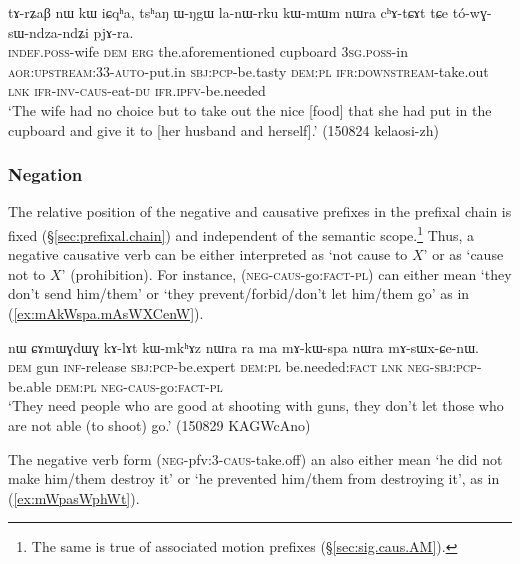 \begin{exe}
\ex \label{ex:toWGsWndzandZi.pjAra}
\gll tɤ-rʑaβ nɯ kɯ iɕqʰa, tsʰaŋ ɯ-ŋgɯ la-nɯ-rku kɯ-mɯm nɯra cʰɤ-tɕɤt tɕe tó-wɣ-sɯ-ndza-ndʑi pjɤ-ra. \\
\textsc{indef}.\textsc{poss}-wife \textsc{dem} \textsc{erg} the.aforementioned cupboard \textsc{3sg}.\textsc{poss}-in \textsc{aor}:\textsc{upstream}:3\fl{}3-\textsc{auto}-put.in \textsc{sbj}:\textsc{pcp}-be.tasty \textsc{dem}:\textsc{pl} \textsc{ifr}:\textsc{downstream}-take.out \textsc{lnk} \textsc{ifr}-\textsc{inv}-\textsc{caus}-eat-\textsc{du} \textsc{ifr}.\textsc{ipfv}-be.needed \\
\glt `The wife had no choice but to take out the nice [food] that she had put in the cupboard and give it to [her husband and herself].' (150824 kelaosi-zh)
\end{exe}


\subsubsection{Negation} \label{sec:sig.caus.negation}
The relative position of the negative and causative prefixes in the prefixal chain is fixed (§\ref{sec:prefixal.chain}) and independent of the semantic scope.\footnote{The same is true of associated motion prefixes (§\ref{sec:sig.caus.AM}). } Thus, a negative causative verb can be either  interpreted as `not cause to $X$' or as `cause not to $X$' (prohibition).   For instance,  (\textsc{neg}-\textsc{caus}-go:\textsc{fact}-\textsc{pl}) can either mean `they don't send him/them' or `they prevent/forbid/don't let him/them go' as in (\ref{ex:mAkWspa.mAsWXCenW}).
 
\begin{exe}
\ex \label{ex:mAkWspa.mAsWXCenW}
\gll nɯ ɕɤmɯɣdɯɣ kɤ-lɤt kɯ-mkʰɤz nɯra ra ma mɤ-kɯ-spa nɯra mɤ-sɯx-ɕe-nɯ. \\
\textsc{dem} gun \textsc{inf}-release \textsc{sbj}:\textsc{pcp}-be.expert \textsc{dem}:\textsc{pl} be.needed:\textsc{fact} \textsc{lnk} \textsc{neg}-\textsc{sbj}:\textsc{pcp}-be.able \textsc{dem}:\textsc{pl} \textsc{neg}-\textsc{caus}-go:\textsc{fact}-\textsc{pl} \\
\glt `They need people who are good at shooting with guns, they don't let those who are not able (to shoot) go.' (150829 KAGWcAno)
\end{exe}
 
The negative verb form  (\textsc{neg}-pfv:3\flobv{}-\textsc{caus}-take.off) an also either mean `he did not make him/them destroy it' or `he prevented him/them from destroying it', as in (\ref{ex:mWpasWphWt}).

